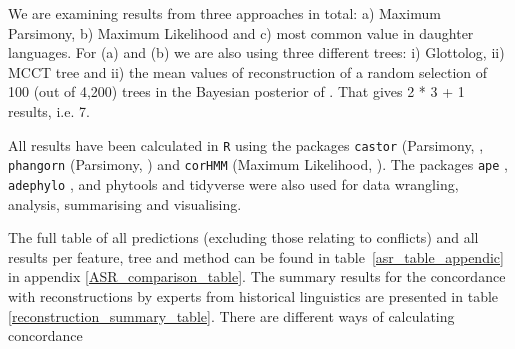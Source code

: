 \documentclass[draft,10pt]{article} %
\begin{document}
We are examining results from three approaches in total: a) Maximum Parsimony, b) Maximum Likelihood and c) most common value in daughter languages. For (a) and (b) we are also using three different trees: i) Glottolog, ii) \citet{grayetal_2009} MCCT tree and ii) the mean values of reconstruction of a random selection of 100 (out of 4,200) trees in the Bayesian posterior of \citet{grayetal_2009}. That gives 2 * 3 + 1 results, i.e. 7.


All results have been calculated in \texttt{R} \citep{R} using the packages \texttt{castor} (Parsimony, \citet{louca2017efficient}, \texttt{phangorn} (Parsimony, \citet{phangorn}) and \texttt{corHMM} (Maximum Likelihood, \citet{corHMM}). The packages \texttt{ape} \citep{paradis2004ape}, \texttt{adephylo} \citep{jombart2017package}, and phytools \citep{revell2012phytools} and tidyverse \citep{tidyverse13} were also used for data wrangling, analysis, summarising and visualising.

The full table of all predictions (excluding those relating to conflicts) and all results per feature, tree and method can be found in table~\ref{asr_table_appendic} in appendix \ref{ASR_comparison_table}. The summary results for the concordance with reconstructions by experts from historical linguistics are presented in table \ref{reconstruction_summary_table}. There are different ways of calculating concordance
 
%
%
%
%
\end{document}
